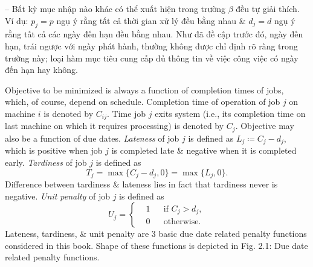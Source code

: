 \documentclass{article}
\begin{document}
\begin{itemize}
\begin{itemize}
        -- Bất kỳ mục nhập nào khác có thể xuất hiện trong trường $\beta$ đều tự giải thích. Ví dụ: $p_j = p$ ngụ ý rằng tất cả thời gian xử lý đều bằng nhau \& $d_j = d$ ngụ ý rằng tất cả các ngày đến hạn đều bằng nhau. Như đã đề cập trước đó, ngày đến hạn, trái ngược với ngày phát hành, thường không được chỉ định rõ ràng trong trường này; loại hàm mục tiêu cung cấp đủ thông tin về việc công việc có ngày đến hạn hay không.

        Objective to be minimized is always a function of completion times of jobs, which, of course, depend on schedule. Completion time of operation of job $j$ on machine $i$ is denoted by $C_{ij}$. Time job $j$ exits system (i.e., its completion time on last machine on which it requires processing) is denoted by $C_j$. Objective may also be a function of due dates. {\it Lateness} of job $j$ is defined as $L_j\coloneqq C_j - d_j$, which is positive when job $j$ is completed late \& negative when it is completed early. {\it Tardiness} of job $j$ is defined as
        \begin{equation*}
            T_j = \max\{C_j - d_j,0\} = \max\{L_j,0\}.
        \end{equation*}
        Difference between tardiness \& lateness lies in fact that tardiness never is negative. {\it Unit penalty} of job $j$ is defined as
        \begin{equation*}
            U_j = \left\{\begin{split}
                &1&&\mbox{if } C_j > d_j,\\
                &0&&\mbox{otherwise}.
            \end{split}\right.
        \end{equation*}
        Lateness, tardiness, \& unit penalty are 3 basic due date related penalty functions considered in this book. Shape of these functions is depicted in {\sf Fig. 2.1: Due date related penalty functions}.


\end{itemize}
\end{itemize}
\end{document}
